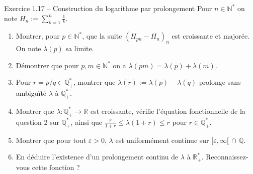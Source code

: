 \documentclass[11pt,a4paper]{article}
\newcommand{\R}{\mathbb{R}}
\newcommand{\N}{\mathbb{N}}
\newcommand{\Q}{\mathbb{Q}}
\theoremstyle{definition}
\begin{document}
\begin{exo}{Exercice 1.17 -- Construction du logarithme par prolongement}
Pour $n\in\N^*$ on note $H_n:=\sum_{k=1}^n\frac1k$.
\begin{enumerate}[label=\arabic*.]
  \item Montrer, pour $p\in\N^*$, que la suite $(H_{pn}-H_n)_n$ est croissante et majorée. On note $\lambda(p)$ sa limite.
  \item Démontrer que pour $p,m\in\N^*$ on a $\lambda(pm)=\lambda(p)+\lambda(m)$.
  \item Pour $r=p/q\in\Q_+^*$, montrer que $\lambda(r):=\lambda(p)-\lambda(q)$ prolonge sans ambiguïté $\lambda$ à $\Q_+^*$.
  \item Montrer que $\lambda:\Q_+^*\to\R$ est croissante, vérifie l'équation fonctionnelle de la question 2 sur $\Q_+^*$, ainsi que $\frac{r}{1+r}\le\lambda(1+r)\le r$ pour $r\in\Q_+^*$.
  \item Montrer que pour tout $\varepsilon>0$, $\lambda$ est uniformément continue sur $[\varepsilon,\infty[\,\cap\,\Q$.
  \item En déduire l'existence d'un prolongement continu de $\lambda$ à $\R_+^*$. Reconnaissez-vous cette fonction ?
\end{enumerate}
\end{exo}
\end{document}
